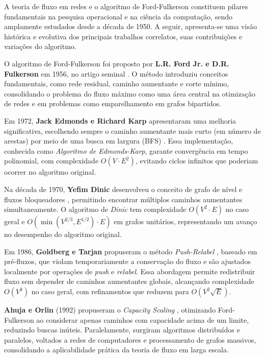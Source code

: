 \documentclass[12pt]{article}
\begin{document}
A teoria de fluxo em redes e o algoritmo de Ford-Fulkerson constituem pilares fundamentais na pesquisa operacional e na ciência da computação, sendo amplamente estudados desde a década de 1950. A seguir, apresenta-se uma visão histórica e evolutiva dos principais trabalhos correlatos, suas contribuições e variações do algoritmo.

\noindent O algoritmo de Ford-Fulkerson foi proposto por \textbf{L.R. Ford Jr. e D.R. Fulkerson} em 1956, no artigo seminal \cite{ford1956}. O método introduziu conceitos fundamentais, como rede residual, caminho aumentante e corte mínimo, consolidando o problema do fluxo máximo como uma área central na otimização de redes e em problemas como emparelhamento em grafos bipartidos.

Em 1972, \textbf{Jack Edmonds e Richard Karp} apresentaram uma melhoria significativa, escolhendo sempre o caminho aumentante mais curto (em número de arestas) por meio de uma busca em largura (BFS) \cite{edmonds1972}. Essa implementação, conhecida como \textit{Algoritmo de Edmonds-Karp}, garante convergência em tempo polinomial, com complexidade $O(V \cdot E^2)$, evitando ciclos infinitos que poderiam ocorrer no algoritmo original.

Na década de 1970, \textbf{Yefim Dinic} desenvolveu o conceito de grafo de nível e fluxos bloqueadores \cite{dinic1970}, permitindo encontrar múltiplos caminhos aumentantes simultaneamente. O algoritmo de \textit{Dinic} tem complexidade $O(V^2 \cdot E)$ no caso geral e $O(\min(V^{2/3}, E^{1/2}) \cdot E)$ em grafos unitários, representando um avanço no desempenho do algoritmo original.

Em 1986, \textbf{Goldberg e Tarjan} propuseram o método \textit{Push-Relabel} \cite{goldberg1988}, baseado em pré-fluxos, que violam temporariamente a conservação do fluxo e são ajustados localmente por operações de \textit{push} e \textit{relabel}. Essa abordagem permite redistribuir fluxo sem depender de caminhos aumentantes globais, alcançando complexidade $O(V^3)$ no caso geral, com refinamentos que reduzem para $O(V^2 \sqrt{E})$.

\textbf{Ahuja e Orlin} (1992) propuseram o \textit{Capacity Scaling} \cite{ahuja1993}, otimizando Ford-Fulkerson ao considerar apenas caminhos com capacidade acima de um limite, reduzindo buscas inúteis. Paralelamente, surgiram algoritmos distribuídos e paralelos, voltados a redes de computadores e processamento de grafos massivos, consolidando a aplicabilidade prática da teoria de fluxo em larga escala.
\end{document}
